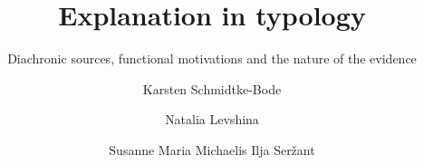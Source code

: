 \title{Explanation in typology}
\subtitle{Diachronic sources, functional motivations and the nature of the evidence}  
\BackBody{~}
\author{ 
Karsten Schmidtke-Bode 			
\and
Natalia Levshina 			
\and
Susanne Maria Michaelis 			
\lastand
Ilja Seržant }
\renewcommand{\lsSeries}{cfls} %
\renewcommand{\lsSeriesNumber}{3} %
\renewcommand{\lsID}{220} 

